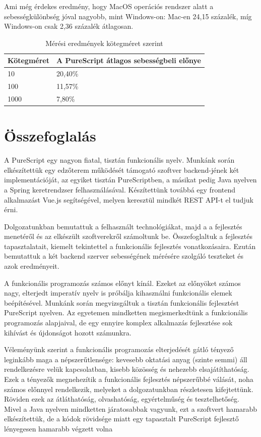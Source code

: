 \documentclass[12pt]{article}
\begin{document}
Ami még érdekes eredmény, hogy MacOS operációs rendszer alatt a sebességkülönbség jóval nagyobb, mint Windows-on: Mac-en 24,15 százalék, míg Windows-on csak 2,36 százalék átlagosan.

\begin{table}[h!]
\centering
\begin{tabular}{ |p{3.2cm}|p{6cm}| } 
\hline
 \textbf{Kötegméret} &\textbf{A PureScript átlagos sebességbeli előnye}\\
\hline10&20,40\%\\
\hline
100& 11,57\%\\
\hline
1000& 7,80\%\\
\hline
\end{tabular}
\caption{Mérési eredmények kötegméret szerint}
\end{table}


\newpage
\section*{Összefoglalás}

A PureScript egy nagyon fiatal, tisztán funkcionális nyelv. Munkánk során elkészítettük egy edzőterem működését támogató szoftver backend-jének két implementációját, az egyiket tisztán PureScriptben, a másikat pedig Java nyelven a Spring keretrendzser felhasználásával. Készítettünk továbbá egy frontend alkalmazást Vue.js segítségével, melyen keresztül mindkét REST API-t el tudjuk érni. 

Dolgozatunkban bemutattuk a felhasznált technológiákat, majd a a fejlesztés menetéről és az elkészült szoftverekről számoltunk be. Összefoglaltuk a fejlesztés tapasztalatait, kiemelt tekintettel a funkcionális fejlesztés vonatkozásaira.  Ezután bemutattuk a két backend szerver sebességének mérésére szolgáló teszteket és azok eredményeit.

A funkcionális programozás számos előnyt kínál. Ezeket az előnyöket számos nagy, elterjedt imperatív nyelv is próbálja kihasználni funkcionális elemek beépítésével. Munkánk során megvizsgáltuk a tisztán funkcionális fejlesztést PureScript nyelven.  Az egyetemen mindketten megismerkedtünk a funkcionális programozás alapjaival, de egy ennyire komplex alkalmazás fejlesztése sok kihívást és újdonságot hozott számunkra. 

Véleményünk szerint a funkcionális programozás elterjedését gátló tényező leginkább maga a népszerűtlensége: kevesebb oktatási anyag (szinte semmi) áll rendelkezésre velük kapcsolatban, kisebb közösség és nehezebb elsajátíthatóság. Ezek a tényezők megnehezítik a funkcionális fejlesztés népszerűbbé válását, noha számos előnnyel rendelkezik, melyeket a dolgozatunkban részletesen kifejtettünk. Röviden ezek az átláthatóság,  olvashatóság, egyértelműség és tesztelhetőség. Mivel a Java nyelven mindketten járatosabbak vagyunk, ezt a szoftvert hamarabb elkészítettük, de a kódok rövidsége miatt egy tapasztalt PureScript fejlesztő lényegesen hamarabb végzett volna
\end{document}
